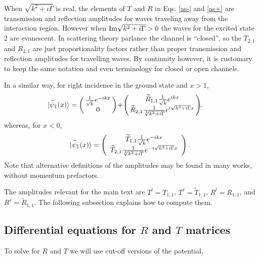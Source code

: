 %
When $\sqrt{k^2+i \Gamma}$ is real, the elements of $T$ and $R$ in Eqs. \eqref{as-} and \eqref{as+}
are transmission and reflection amplitudes for waves traveling away from the interaction region.
However when  ${\rm Im}\sqrt{k^2+i \Gamma}>0$ the waves for the excited state $2$ are evanescent.
In scattering theory parlance the channel is ``closed'', so  the $T_{2,1}$ and $R_{2,1}$ are just proportionality factors
rather than proper transmission
and reflection amplitudes for travelling waves. By continuity however, it is customary to keep the same notation
and even terminology for closed or open channels.


In a similar way, for right incidence in the ground state and
$x > 1$,
%
\begin{eqnarray}
	\hspace*{-.5cm}|\widetilde\psi_1 (x)\ra = \left(\!\!\begin{array}{c} \frac{1}{\sqrt{k}}e^{-i k x} \\ 0\end{array}\!\!\right)
	\!+\! \left(\!\!\begin{array}{c}
	\widetilde R_{1,1} \frac{1}{\sqrt{k}}e^{i k x}
	\\
	\widetilde R_{2,1} \frac{1}{\sqrt[4]{k^2+i \Gamma}} e^{i \sqrt{k^2+i \Gamma} x}
	\end{array}\!\!\right)\!\!,
\end{eqnarray}
%
whereas, for $x<0$,
%
\begin{eqnarray}
	|\widetilde \psi_1 (x)\rangle = \left(\begin{array}{c}
	\widetilde T_{1,1} \frac{1}{\sqrt{k}}e^{-i k x} \\
	\widetilde T_{2,1} \frac{1}{\sqrt[4]{k^2+i \Gamma}} e^{-i \sqrt{k^2+i \Gamma} x}
	\end{array}\right).
\end{eqnarray}
%
Note that alternative definitions of the amplitudes may be found in many works,
without momentum prefactors.

The amplitudes relevant for the main text are $T^l=T_{1,1}$,
$T^r=\widetilde{T}_{1,1}$, $R^l=R_{1,1}$, and $R^r=\widetilde{R}_{1,1}$.  The following
subsection explains how to compute them.


\subsection{Differential equations for $R$ and $T$ matrices}
To solve for $R$ and $T$ we will use cut-off versions of the  potential,
%

